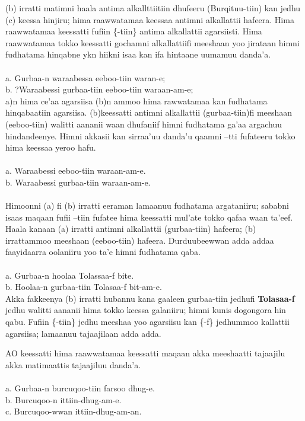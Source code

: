 \documentclass[11pt,b5paper]{book}
\begin{document}
(b) irratti matimni haala antima alkallttiitiin dhufeeru (Burqituu-tiin) kan jedhu (c) keessa hinjiru; hima raawwatamaa keessaa antimni alkallattii hafeera. Hima raawwatamaa keessatti fufiin \{-tiin\} antima alkallattii agarsiisti. Hima raawwatamaa tokko keessatti gochamni alkallattiifi meeshaan
yoo jirataan himni fudhatama hinqabne ykn hiikni isaa kan ifa hintaane uumamuu danda’a.\\
\\
a. Gurbaa-n waraabessa eeboo-tiin waran-e;\\
b. ?Waraabessi gurbaa-tiin eeboo-tiin waraan-am-e;\\

a)n hima ce’aa agarsiisa (b)n ammoo hima rawwatamaa kan fudhatama hinqabaatiin agarsiisa. (b)keessatti antimni alkallattii (gurbaa-tiin)fi meeshaan (eeboo-tiin) walitti aananii waan dhufaniif himni fudhatama ga’aa argachuu hindandeenye. Himni akkasii kan sirraa’uu danda’u qaamni –tti fufateeru
tokko hima keessaa yeroo hafu. \\
\\
a. Waraabessi eeboo-tiin waraan-am-e.\\
b. Waraabessi gurbaa-tiin waraan-am-e.\\
\\
Himoonni (a) fi (b) irratti eeraman lamaanuu fudhatama argataniiru; sababni isaas maqaan fufii –tiin fufatee hima keessatti mul’ate tokko qafaa waan ta’eef. Haala kanaan (a) irratti antimni alkallattii (gurbaa-tiin) hafeera; (b) irrattammoo meeshaan (eeboo-tiin) hafeera. Durduubeewwan adda addaa faayidaarra oolaniiru yoo ta’e himni fudhatama qaba. \\
\\
a. Gurbaa-n hoolaa Tolassaa-f bite.\\
b. Hoolaa-n gurbaa-tiin Tolasaa-f bit-am-e. \\

Akka fakkeenya (b) irratti hubannu kana gaaleen gurbaa-tiin jedhufi \textbf{Tolasaa-f} jedhu walitti aananii hima tokko keessa galaniiru; himni kunis dogongora hin qabu. Fufiin \{-tiin\} jedhu meeshaa yoo agarsiisu kan \{-f\} jedhummoo kallattii agarsiisa; lamaanuu tajaajilaan adda adda.

AO keessatti hima raawwatamaa keessatti maqaan akka meeshaatti tajaajilu akka matimaattis tajaajiluu danda’a.\\
\\
a. Gurbaa-n burcuqoo-tiin farsoo dhug-e.\\
b. Burcuqoo-n ittiin-dhug-am-e.\\
c. Burcuqoo-wwan ittiin-dhug-am-an. \\
\end{document}
